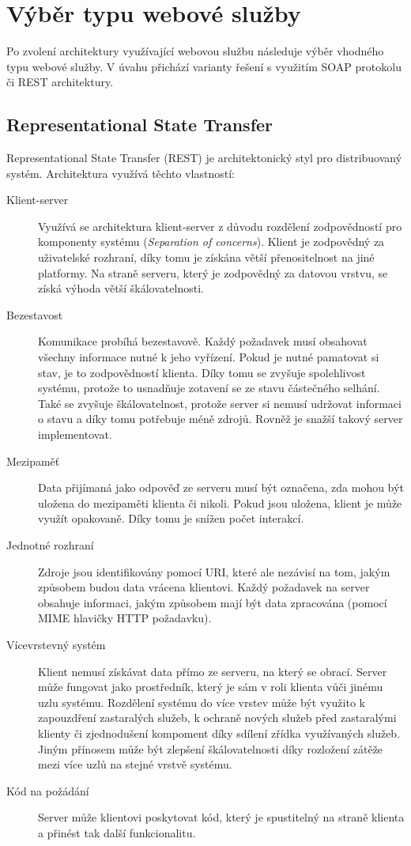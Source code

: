 \documentclass{diplomka}
\begin{document}
\newpage
\section{Výběr typu webové služby}
Po zvolení architektury využívající webovou službu následuje výběr vhodného typu webové služby. V úvahu přichází varianty řešení s využitím SOAP protokolu či REST architektury.
\subsection{Representational State Transfer}
Representational State Transfer\cite{rest} (REST) je architektonický styl pro distribuovaný systém. Architektura využívá těchto vlastností:
\begin{description}
\item [Klient-server] Využívá se architektura klient-server z důvodu rozdělení zodpovědností pro komponenty systému (\emph{Separation of concerns}). Klient je zodpovědný za uživatelské rozhraní, díky tomu je získána větší přenositelnost na jiné platformy. Na straně serveru, který je zodpovědný za datovou vrstvu, se získá výhoda větší škálovatelnosti. 
\item [Bezestavost] Komunikace probíhá bezestavově. Každý požadavek musí obsahovat všechny informace nutné k jeho vyřízení. Pokud je nutné pamatovat si stav, je to zodpovědností klienta. Díky tomu se zvyšuje spolehlivost systému, protože to usnadňuje zotavení se ze stavu částečného selhání. Také se zvyšuje škálovatelnost, protože server si nemusí udržovat informaci o stavu a díky tomu potřebuje méně zdrojů. Rovněž je snažší takový server implementovat.
\item [Mezipaměť] Data přijímaná jako odpověď ze serveru musí být označena, zda mohou být uložena do mezipaměti klienta či nikoli. Pokud jsou uložena, klient je může využít opakovaně. Díky tomu je snížen počet interakcí. 
\item [Jednotné rozhraní] Zdroje jsou identifikovány pomocí URI, které ale nezávisí na tom, jakým způsobem budou data vrácena klientovi. Každý požadavek na server obsahuje informaci, jakým způsobem mají být data zpracována (pomocí MIME hlavičky HTTP požadavku).  
\item [Vícevrstevný systém] Klient nemusí získávat data přímo ze serveru, na který se obrací. Server může fungovat jako prostředník, který je sám v roli klienta vůči jinému uzlu systému. Rozdělení systému do více vrstev může být využito k zapouzdření zastaralých služeb, k ochraně nových služeb před zastaralými klienty či zjednodušení kompoment díky sdílení zřídka využívaných služeb. Jiným přínosem může být zlepšení škálovatelnosti díky rozložení zátěže mezi více uzlů na stejné vrstvě systému.
\item [Kód na požádání] Server může klientovi poskytovat kód, který je spustitelný na straně klienta a přinést tak další funkcionalitu.
\end{description}
\end{document}
